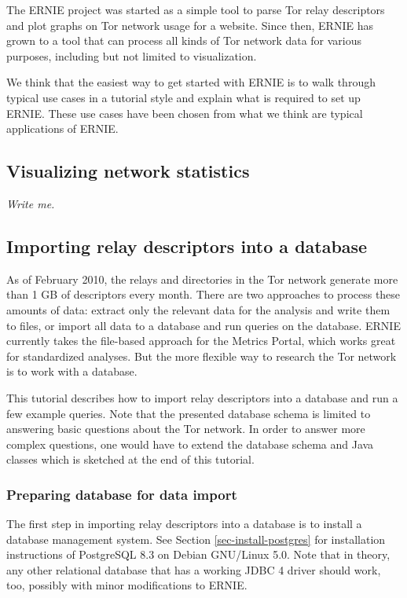 \documentclass{article}
\begin{document}
The ERNIE project was started as a simple tool to parse Tor relay
descriptors and plot graphs on Tor network usage for a website.
Since then, ERNIE has grown to a tool that can process all kinds of Tor
network data for various purposes, including but not limited to
visualization.

We think that the easiest way to get started with ERNIE is to walk through
typical use cases in a tutorial style and explain what is required to set
up ERNIE.
These use cases have been chosen from what we think are typical
applications of ERNIE.

\subsection{Visualizing network statistics}

{\it Write me.}

\subsection{Importing relay descriptors into a database}

As of February 2010, the relays and directories in the Tor network
generate more than 1 GB of descriptors every month.
There are two approaches to process these amounts of data:
extract only the relevant data for the analysis and write them to files,
or import all data to a database and run queries on the database.
ERNIE currently takes the file-based approach for the Metrics Portal,
which works great for standardized analyses.
But the more flexible way to research the Tor network is to work with a
database.

This tutorial describes how to import relay descriptors into a database
and run a few example queries.
Note that the presented database schema is limited to answering basic
questions about the Tor network.
In order to answer more complex questions, one would have to extend the
database schema and Java classes which is sketched at the end of this
tutorial.

\subsubsection{Preparing database for data import}

The first step in importing relay descriptors into a database is to
install a database management system.
See Section \ref{sec-install-postgres} for installation instructions of
PostgreSQL 8.3 on Debian GNU/Linux 5.0.
Note that in theory, any other relational database that has a working JDBC
4 driver should work, too, possibly with minor modifications to ERNIE.
\end{document}
